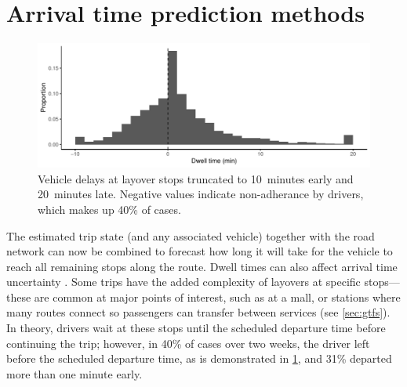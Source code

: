 \section{Arrival time prediction methods}
\label{sec:prediction_arrival_time}




\begin{knitrout}\small
{}\color{fgcolor}\begin{figure}

{\centering \includegraphics[width=\linewidth]{figure/layover_observance-1} 

}

\caption[Vehicle delays at layover stops truncated to 10~minutes early and 20~minutes late]{Vehicle delays at layover stops truncated to 10~minutes early and 20~minutes late. Negative values indicate non-adherance by drivers, which makes up 40\% of cases.}\label{fig:layover_observance}
\end{figure}


\end{knitrout}

The estimated trip state (and any associated vehicle) together with the road network can now be combined to forecast how long it will take for the vehicle to reach all remaining stops along the route. Dwell times can also affect arrival time uncertainty \citep{Shen_2013,Wang_2016,Robinson_2013,Meng_2013,Shalaby_2004,Hans_2015}. Some trips have the added complexity of layovers at specific stops---these are common at major points of interest, such as at a mall, or stations where many routes connect so passengers can transfer between services (see \cref{sec:gtfs}). In theory, drivers wait at these stops until the scheduled departure time before continuing the trip; however, in 40\% of cases over two weeks, the driver left before the scheduled departure time, as is demonstrated in \cref{fig:layover_observance}, and 31\% departed more than one minute early.


